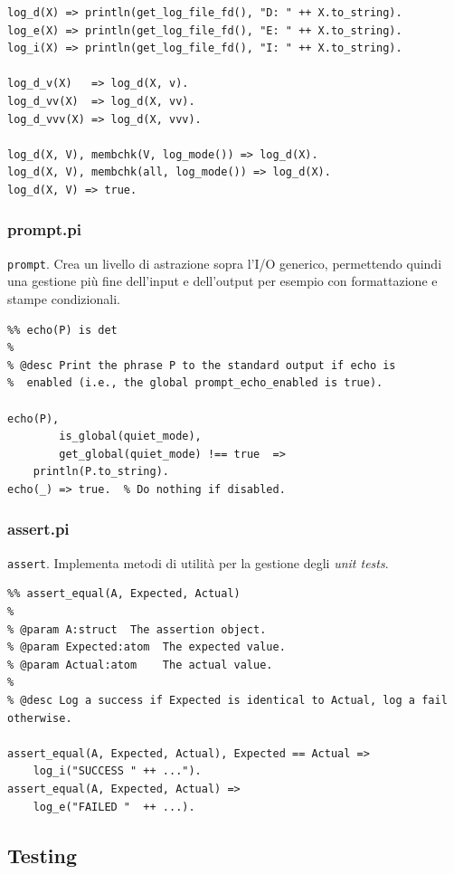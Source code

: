 \documentclass[12pt,a4paper,openright]{book} %
\begin{document}
\begin{verbatim}
log_d(X) => println(get_log_file_fd(), "D: " ++ X.to_string).
log_e(X) => println(get_log_file_fd(), "E: " ++ X.to_string).
log_i(X) => println(get_log_file_fd(), "I: " ++ X.to_string).

log_d_v(X)   => log_d(X, v).
log_d_vv(X)  => log_d(X, vv).
log_d_vvv(X) => log_d(X, vvv).

log_d(X, V), membchk(V, log_mode()) => log_d(X).
log_d(X, V), membchk(all, log_mode()) => log_d(X).
log_d(X, V) => true.
\end{verbatim}

\subsubsection{prompt.pi}

\verb|prompt|. Crea un livello di astrazione sopra l'I/O generico, permettendo quindi una gestione più fine dell'input e dell'output per esempio con formattazione e stampe condizionali.

\begin{verbatim}
%% echo(P) is det
%
% @desc Print the phrase P to the standard output if echo is 
%  enabled (i.e., the global prompt_echo_enabled is true).

echo(P), 
        is_global(quiet_mode), 
        get_global(quiet_mode) !== true  => 
    println(P.to_string).
echo(_) => true.  % Do nothing if disabled.
\end{verbatim}

\subsubsection{assert.pi}

\verb|assert|. Implementa metodi di utilità per la gestione degli \emph{unit tests}.

\begin{verbatim}
%% assert_equal(A, Expected, Actual)
%
% @param A:struct  The assertion object.
% @param Expected:atom  The expected value.
% @param Actual:atom    The actual value.
%
% @desc Log a success if Expected is identical to Actual, log a fail otherwise.

assert_equal(A, Expected, Actual), Expected == Actual => 
    log_i("SUCCESS " ++ ...").
assert_equal(A, Expected, Actual) => 
    log_e("FAILED "  ++ ...).
\end{verbatim}

\subsection{Testing}
\label{ch:clpsetpicat_system_tests}
\end{document}
